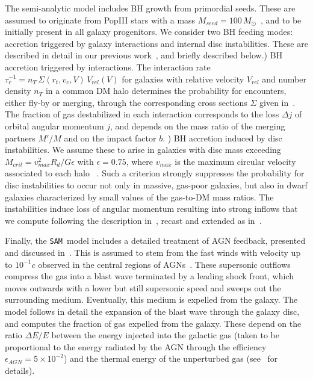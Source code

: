 \documentclass[twocolumn,trackchanges]{aastex63}
\newcommand{\sam}{\texttt{SAM}}
\begin{document}
The semi-analytic model includes BH growth from primordial seeds. These are assumed to originate from PopIII stars with a mass $M_{seed}=100\,M_{\odot}$~\citep{Madau2001}, and to be initially present in all galaxy progenitors. We consider two BH feeding modes: accretion triggered by galaxy interactions and internal disc instabilities. These are described in detail in our previous work~\citep{Menci2016}, and briefly described below.) BH accretion triggered by interactions. The interaction rate $\tau_r^{-1}=n_T\,\Sigma (r_t,v_c,V)\,V_{rel} (V)$ for galaxies with relative velocity $V_{rel}$ and number density $n_T$ in a common DM halo determines the probability for encounters, 
either fly-by or  merging, through the corresponding cross sections $\Sigma$ given in~\citet{Menci2014}. The fraction of
gas destabilized in each interaction corresponds to the loss $\Delta j$ of orbital angular momentum $j$, and depends on the mass ratio of the merging partners $M'/M$ and on the impact factor $b$. ) BH accretion induced by disc instabilities. We assume these to arise  in  galaxies with disc mass exceeding~\citep{Efstathiou1982} $M_{crit} =  {v_{max}^2 R_{d}/ G \epsilon}$ with $\epsilon=0.75$, where $v_{max}$ is the maximum circular velocity associated to each halo ~\citep{Mo1998}. 
Such a criterion strongly suppresses the probability for disc instabilities to occur not only in massive, gas-poor galaxies, but also in 
dwarf galaxies characterized by small values of the gas-to-DM mass ratios.
The instabilities induce loss of angular momentum resulting into strong inflows that we compute following the 
description in~\citet{Hopkins2011}, recast and extended as in~\citet{Menci2014}. 

Finally, the \sam\ model includes a detailed treatment of AGN feedback, presented and discussed in~\citet{Menci2008}.
This is assumed to stem from the fast winds with velocity up to
$10^{-1}c$ observed in the central regions of AGNs~\citep{Chartas2002, Pounds2003}.  
These supersonic outflows compress the gas into a blast wave terminated by
a leading shock front, which  moves outwards with a lower but still
supersonic speed and sweeps out the surrounding medium. Eventually,
this medium is expelled from the galaxy. The model follows in detail the expansion of the 
blast wave through the galaxy disc, and computes the fraction of gas expelled from the galaxy.  
These depend on the ratio $\Delta E/E$ between the  energy injected into the galactic gas 
(taken to be proportional to the energy radiated by the 
AGN through the efficiency $\epsilon_{AGN}=5\times 10^{-2}$)
and the thermal energy of the unperturbed gas (see~\citep{Menci2008} for details). 
\end{document}
